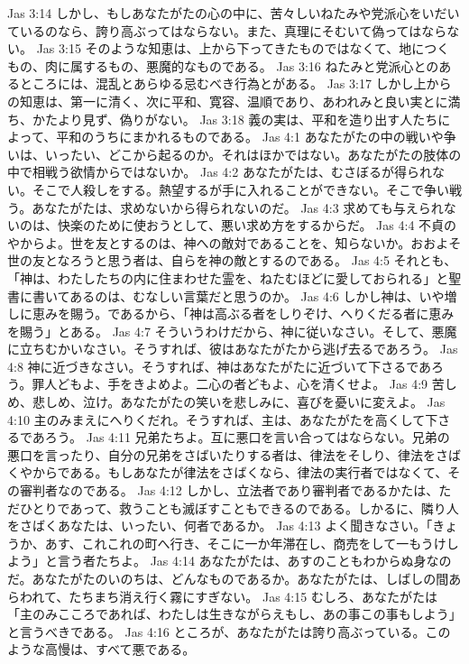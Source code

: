 Jas 3:14  しかし、もしあなたがたの心の中に、苦々しいねたみや党派心をいだいているのなら、誇り高ぶってはならない。また、真理にそむいて偽ってはならない。
Jas 3:15  そのような知恵は、上から下ってきたものではなくて、地につくもの、肉に属するもの、悪魔的なものである。
Jas 3:16  ねたみと党派心とのあるところには、混乱とあらゆる忌むべき行為とがある。
Jas 3:17  しかし上からの知恵は、第一に清く、次に平和、寛容、温順であり、あわれみと良い実とに満ち、かたより見ず、偽りがない。
Jas 3:18  義の実は、平和を造り出す人たちによって、平和のうちにまかれるものである。
Jas 4:1  あなたがたの中の戦いや争いは、いったい、どこから起るのか。それはほかではない。あなたがたの肢体の中で相戦う欲情からではないか。
Jas 4:2  あなたがたは、むさぼるが得られない。そこで人殺しをする。熱望するが手に入れることができない。そこで争い戦う。あなたがたは、求めないから得られないのだ。
Jas 4:3  求めても与えられないのは、快楽のために使おうとして、悪い求め方をするからだ。
Jas 4:4  不貞のやからよ。世を友とするのは、神への敵対であることを、知らないか。おおよそ世の友となろうと思う者は、自らを神の敵とするのである。
Jas 4:5  それとも、「神は、わたしたちの内に住まわせた霊を、ねたむほどに愛しておられる」と聖書に書いてあるのは、むなしい言葉だと思うのか。
Jas 4:6  しかし神は、いや増しに恵みを賜う。であるから、「神は高ぶる者をしりぞけ、へりくだる者に恵みを賜う」とある。
Jas 4:7  そういうわけだから、神に従いなさい。そして、悪魔に立ちむかいなさい。そうすれば、彼はあなたがたから逃げ去るであろう。
Jas 4:8  神に近づきなさい。そうすれば、神はあなたがたに近づいて下さるであろう。罪人どもよ、手をきよめよ。二心の者どもよ、心を清くせよ。
Jas 4:9  苦しめ、悲しめ、泣け。あなたがたの笑いを悲しみに、喜びを憂いに変えよ。
Jas 4:10  主のみまえにへりくだれ。そうすれば、主は、あなたがたを高くして下さるであろう。
Jas 4:11  兄弟たちよ。互に悪口を言い合ってはならない。兄弟の悪口を言ったり、自分の兄弟をさばいたりする者は、律法をそしり、律法をさばくやからである。もしあなたが律法をさばくなら、律法の実行者ではなくて、その審判者なのである。
Jas 4:12  しかし、立法者であり審判者であるかたは、ただひとりであって、救うことも滅ぼすこともできるのである。しかるに、隣り人をさばくあなたは、いったい、何者であるか。
Jas 4:13  よく聞きなさい。「きょうか、あす、これこれの町へ行き、そこに一か年滞在し、商売をして一もうけしよう」と言う者たちよ。
Jas 4:14  あなたがたは、あすのこともわからぬ身なのだ。あなたがたのいのちは、どんなものであるか。あなたがたは、しばしの間あらわれて、たちまち消え行く霧にすぎない。
Jas 4:15  むしろ、あなたがたは「主のみこころであれば、わたしは生きながらえもし、あの事この事もしよう」と言うべきである。
Jas 4:16  ところが、あなたがたは誇り高ぶっている。このような高慢は、すべて悪である。
